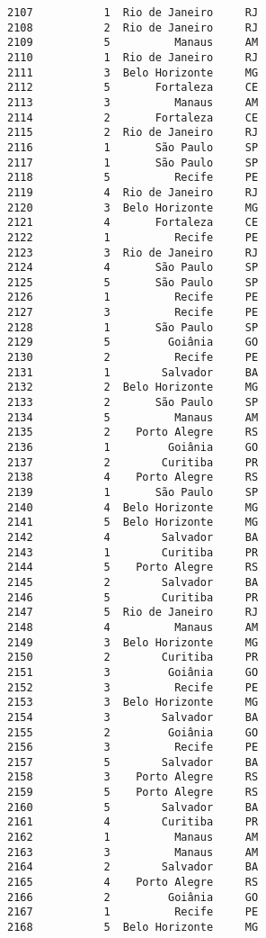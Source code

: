 \documentclass[11pt]{article}
\begin{document}
\begin{Verbatim}[commandchars=\\\{\}]
2107           1  Rio de Janeiro     RJ  
2108           2  Rio de Janeiro     RJ  
2109           5          Manaus     AM  
2110           1  Rio de Janeiro     RJ  
2111           3  Belo Horizonte     MG  
2112           5       Fortaleza     CE  
2113           3          Manaus     AM  
2114           2       Fortaleza     CE  
2115           2  Rio de Janeiro     RJ  
2116           1       São Paulo     SP  
2117           1       São Paulo     SP  
2118           5          Recife     PE  
2119           4  Rio de Janeiro     RJ  
2120           3  Belo Horizonte     MG  
2121           4       Fortaleza     CE  
2122           1          Recife     PE  
2123           3  Rio de Janeiro     RJ  
2124           4       São Paulo     SP  
2125           5       São Paulo     SP  
2126           1          Recife     PE  
2127           3          Recife     PE  
2128           1       São Paulo     SP  
2129           5         Goiânia     GO  
2130           2          Recife     PE  
2131           1        Salvador     BA  
2132           2  Belo Horizonte     MG  
2133           2       São Paulo     SP  
2134           5          Manaus     AM  
2135           2    Porto Alegre     RS  
2136           1         Goiânia     GO  
2137           2        Curitiba     PR  
2138           4    Porto Alegre     RS  
2139           1       São Paulo     SP  
2140           4  Belo Horizonte     MG  
2141           5  Belo Horizonte     MG  
2142           4        Salvador     BA  
2143           1        Curitiba     PR  
2144           5    Porto Alegre     RS  
2145           2        Salvador     BA  
2146           5        Curitiba     PR  
2147           5  Rio de Janeiro     RJ  
2148           4          Manaus     AM  
2149           3  Belo Horizonte     MG  
2150           2        Curitiba     PR  
2151           3         Goiânia     GO  
2152           3          Recife     PE  
2153           3  Belo Horizonte     MG  
2154           3        Salvador     BA  
2155           2         Goiânia     GO  
2156           3          Recife     PE  
2157           5        Salvador     BA  
2158           3    Porto Alegre     RS  
2159           5    Porto Alegre     RS  
2160           5        Salvador     BA  
2161           4        Curitiba     PR  
2162           1          Manaus     AM  
2163           3          Manaus     AM  
2164           2        Salvador     BA  
2165           4    Porto Alegre     RS  
2166           2         Goiânia     GO  
2167           1          Recife     PE  
2168           5  Belo Horizonte     MG  

\end{Verbatim}
\end{document}
